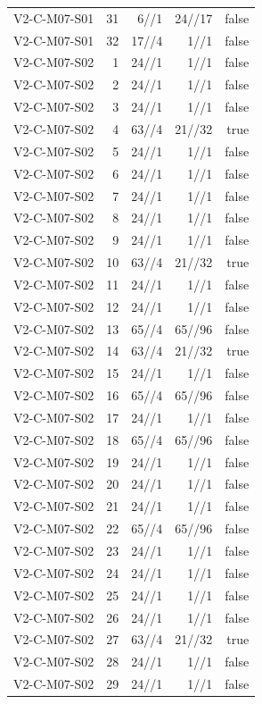 {\begin{longtable}{lrrrr}
V2-C-M07-S01 & 31 & 6//1 & 24//17 & false \\
V2-C-M07-S01 & 32 & 17//4 & 1//1 & false \\
V2-C-M07-S02 & 1 & 24//1 & 1//1 & false \\
V2-C-M07-S02 & 2 & 24//1 & 1//1 & false \\
V2-C-M07-S02 & 3 & 24//1 & 1//1 & false \\
V2-C-M07-S02 & 4 & 63//4 & 21//32 & true \\
V2-C-M07-S02 & 5 & 24//1 & 1//1 & false \\
V2-C-M07-S02 & 6 & 24//1 & 1//1 & false \\
V2-C-M07-S02 & 7 & 24//1 & 1//1 & false \\
V2-C-M07-S02 & 8 & 24//1 & 1//1 & false \\
V2-C-M07-S02 & 9 & 24//1 & 1//1 & false \\
V2-C-M07-S02 & 10 & 63//4 & 21//32 & true \\
V2-C-M07-S02 & 11 & 24//1 & 1//1 & false \\
V2-C-M07-S02 & 12 & 24//1 & 1//1 & false \\
V2-C-M07-S02 & 13 & 65//4 & 65//96 & false \\
V2-C-M07-S02 & 14 & 63//4 & 21//32 & true \\
V2-C-M07-S02 & 15 & 24//1 & 1//1 & false \\
V2-C-M07-S02 & 16 & 65//4 & 65//96 & false \\
V2-C-M07-S02 & 17 & 24//1 & 1//1 & false \\
V2-C-M07-S02 & 18 & 65//4 & 65//96 & false \\
V2-C-M07-S02 & 19 & 24//1 & 1//1 & false \\
V2-C-M07-S02 & 20 & 24//1 & 1//1 & false \\
V2-C-M07-S02 & 21 & 24//1 & 1//1 & false \\
V2-C-M07-S02 & 22 & 65//4 & 65//96 & false \\
V2-C-M07-S02 & 23 & 24//1 & 1//1 & false \\
V2-C-M07-S02 & 24 & 24//1 & 1//1 & false \\
V2-C-M07-S02 & 25 & 24//1 & 1//1 & false \\
V2-C-M07-S02 & 26 & 24//1 & 1//1 & false \\
V2-C-M07-S02 & 27 & 63//4 & 21//32 & true \\
V2-C-M07-S02 & 28 & 24//1 & 1//1 & false \\
V2-C-M07-S02 & 29 & 24//1 & 1//1 & false \\

\end{longtable}}
